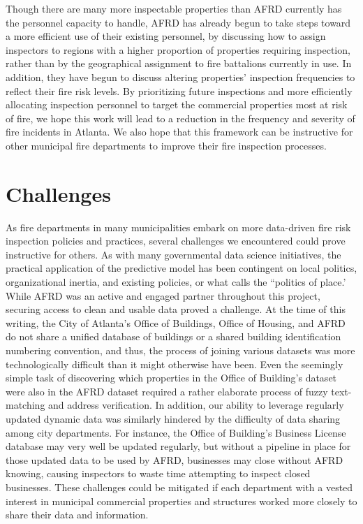 \documentclass{sig-alternate-05-2015}
\begin{document}
{Though there are many more inspectable properties than AFRD currently has the personnel capacity to handle, AFRD has already begun to take steps toward a more efficient use of their existing personnel, by discussing how to assign inspectors to regions with a higher proportion of properties requiring inspection, rather than by the geographical assignment to fire battalions currently in use. In addition, they have begun to discuss altering properties' inspection frequencies to reflect their fire risk levels. By prioritizing future inspections and more efficiently allocating inspection personnel to target the commercial properties most at risk of fire, we hope this work will lead to a reduction in the frequency and severity of fire incidents in Atlanta. We also hope that this framework can be instructive for other municipal fire departments to improve their fire inspection processes.

\section{Challenges}
As fire departments in many municipalities embark on more data-driven fire risk inspection policies and practices, several challenges we encountered could prove instructive for others. As with many governmental data science initiatives, the practical application of the predictive model has been contingent on local politics, organizational inertia, and existing policies, or what \cite{carr05} calls the ``politics of place.' While AFRD was an active and engaged partner throughout this project, securing access to clean and usable data proved a challenge. At the time of this writing, the City of Atlanta's Office of Buildings, Office of Housing, and AFRD do not share a unified database of buildings or a shared building identification numbering convention, and thus, the process of joining various datasets was more technologically difficult than it might otherwise have been. Even the seemingly simple task of discovering which properties in the Office of Building's dataset were also in the AFRD dataset required a rather elaborate process of fuzzy text-matching and address verification. In addition, our ability to leverage regularly updated dynamic data was similarly hindered by the difficulty of data sharing among city departments. For instance, the Office of Building's Business License database may very well be updated regularly, but without a pipeline in place for those updated data to be used by AFRD, businesses may close without AFRD knowing, causing inspectors to waste time attempting to inspect closed businesses. These challenges could be mitigated if each department with a vested interest in municipal commercial properties and structures worked more closely to share their data and information. 

}
\end{document}
